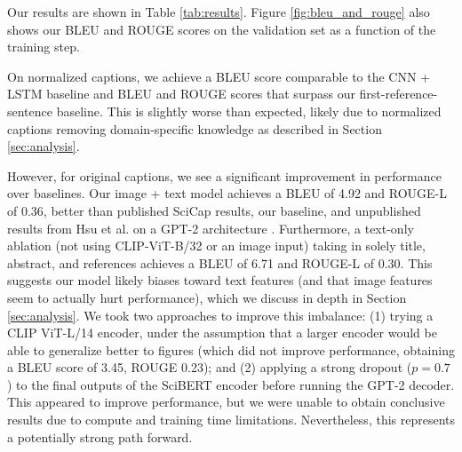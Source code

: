 \documentclass{article}
\begin{document}

Our results are shown in Table \ref{tab:results}. Figure \ref{fig:bleu_and_rouge} also shows our BLEU and ROUGE scores on the validation set as a function of the training step.

On normalized captions, we achieve a BLEU score comparable to the CNN + LSTM baseline and BLEU and ROUGE scores that surpass our first-reference-sentence baseline. This is slightly worse than expected, likely due to normalized captions removing domain-specific knowledge as described in Section \ref{sec:analysis}.

However, for original captions, we see a significant improvement in performance over baselines. Our image + text model achieves a BLEU of 4.92 and ROUGE-L of 0.36, better than published SciCap results, our baseline, and unpublished results from Hsu et al. on a GPT-2 architecture \citep{kenneth_huang__survival_game_in-person_moment_2021}. Furthermore, a text-only ablation (not using CLIP-ViT-B/32 or an image input) taking in solely title, abstract, and references achieves a BLEU of 6.71 and ROUGE-L of 0.30. This suggests our model likely biases toward text features (and that image features seem to actually hurt performance), which we discuss in depth in Section \ref{sec:analysis}. We took two approaches to improve this imbalance: (1) trying a CLIP ViT-L/14 encoder, under the assumption that a larger encoder would be able to generalize better to figures (which did not improve performance, obtaining a BLEU score of 3.45, ROUGE 0.23); and (2) applying a strong dropout ($p = 0.7$) to the final outputs of the SciBERT encoder before running the GPT-2 decoder. This appeared to improve performance, but we were unable to obtain conclusive results due to compute and training time limitations. Nevertheless, this represents a potentially strong path forward.
\end{document}
